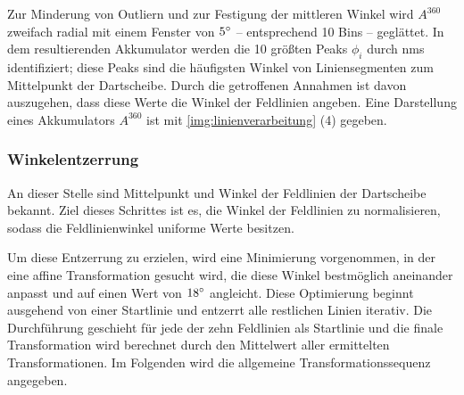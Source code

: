Zur Minderung von Outliern und zur Festigung der mittleren Winkel wird $A^{360}$ zweifach radial mit einem Fenster von $5^{\circ}$ -- entsprechend 10 Bins -- geglättet. In dem resultierenden Akkumulator werden die 10 größten Peaks $\phi_i$ durch \ac{nms} identifiziert; diese Peaks sind die häufigsten Winkel von Liniensegmenten zum Mittelpunkt der Dartscheibe. Durch die getroffenen Annahmen ist davon auszugehen, dass diese Werte die Winkel der Feldlinien angeben. Eine Darstellung eines Akkumulators $A^{360}$ ist mit \autoref{img:linienverarbeitung} (4) gegeben.

\subsubsection{Winkelentzerrung}
\label{sec:winkelentzerrung}

An dieser Stelle sind Mittelpunkt und Winkel der Feldlinien der Dartscheibe bekannt. Ziel dieses Schrittes ist es, die Winkel der Feldlinien zu normalisieren, sodass die Feldlinienwinkel uniforme Werte besitzen.

Um diese Entzerrung zu erzielen, wird eine Minimierung vorgenommen, in der eine affine Transformation gesucht wird, die diese Winkel bestmöglich aneinander anpasst und auf einen Wert von $18^{\circ}$ angleicht. Diese Optimierung beginnt ausgehend von einer Startlinie und entzerrt alle restlichen Linien iterativ. Die Durchführung geschieht für jede der zehn Feldlinien als Startlinie und die finale Transformation wird berechnet durch den Mittelwert aller ermittelten Transformationen. Im Folgenden wird die allgemeine Transformationssequenz angegeben.

